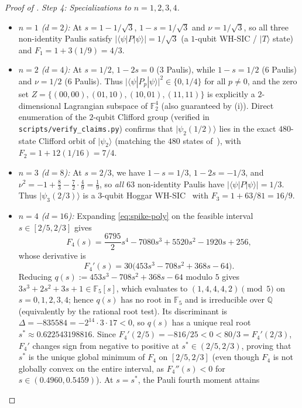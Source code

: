 \documentclass[11pt,a4paper]{article}
\theoremstyle{plain}
\theoremstyle{definition}
\theoremstyle{remark}
\newcommand{\Q}{\mathbb{Q}}
\newcommand{\F}{\mathbb{F}}
\newcommand{\ket}[1]{|#1\rangle}
\newcommand{\expval}[2]{\langle#1|#2|#1\rangle}
\newcommand{\abs}[1]{\lvert#1\rvert}
\numberwithin{equation}{section}
\begin{document}
\begin{proof}[Proof of ]
\emph{Step 4: Specializations to $n = 1, 2, 3, 4$.}
\begin{itemize}[leftmargin=1.8em]
  \item \emph{$n = 1$ ($d = 2$):} At $s = 1 - 1/\sqrt{3}$, $1 - s = 1/\sqrt{3}$ and $\nu = 1/\sqrt{3}$, so all three non-identity Paulis satisfy $\abs{\expval{\psi}{P}} = 1/\sqrt{3}$ (a $1$-qubit WH-SIC / $\ket{T}$ state) and $F_1 = 1 + 3(1/9) = 4/3$.
  \item \emph{$n = 2$ ($d = 4$):} At $s = 1/2$, $1 - 2s = 0$ ($3$ Paulis), while $1 - s = 1/2$ ($6$ Paulis) and $\nu = 1/2$ ($6$ Paulis). Thus $\abs{\expval{\psi}{P_p}}^2 \in \{0, 1/4\}$ for all $p \neq 0$, and the zero set $Z = \{(00,00),(01,10),(10,01),(11,11)\}$ is explicitly a $2$-dimensional Lagrangian subspace of $\F_2^4$ (also guaranteed by (i)). Direct enumeration of the $2$-qubit Clifford group (verified in \texttt{\small scripts/\allowbreak verify\_claims.py}) confirms that $\ket{\psi_2(1/2)}$ lies in the exact $480$-state Clifford orbit of $\ket{\psi_2}$ (matching the $480$ states of~\cite{liu2026maximal}), with $F_2 = 1 + 12(1/16) = 7/4$.
  \item \emph{$n = 3$ ($d = 8$):} At $s = 2/3$, we have $1 - s = 1/3$, $1 - 2s = -1/3$, and $\nu^2 = -1 + \frac{8}{3} - \frac{7}{2}\cdot\frac{4}{9} = \frac{1}{9}$, so \emph{all $63$} non-identity Paulis have $\abs{\expval{\psi}{P}} = 1/3$. Thus $\ket{\psi_3(2/3)}$ is a $3$-qubit Hoggar WH-SIC~\cite{hoggar1998lines} with $F_3 = 1 + 63/81 = 16/9$.
  \item \emph{$n = 4$ ($d = 16$):} Expanding \eqref{eq:spike-poly} on the feasible interval $s \in [2/5, 2/3]$ gives
  \[
    F_4(s) = \frac{6795}{2}s^4 - 7080 s^3 + 5520 s^2 - 1920 s + 256,
  \]
  whose derivative is
  \[
    F_4'(s) = 30\bigl(453 s^3 - 708 s^2 + 368 s - 64\bigr).
  \]
  Reducing $q(s) := 453 s^3 - 708 s^2 + 368 s - 64$ modulo $5$ gives $3s^3 + 2s^2 + 3s + 1 \in \F_5[s]$, which evaluates to $(1, 4, 4, 4, 2) \pmod{5}$ on $s = 0, 1, 2, 3, 4$; hence $q(s)$ has no root in $\F_5$ and is irreducible over $\Q$ (equivalently by the rational root test). Its discriminant is $\Delta = -835584 = -2^{14}\cdot 3 \cdot 17 < 0$, so $q(s)$ has a unique real root $s^* \approx 0.622543198816$. Since $F_4'(2/5) = -816/25 < 0 < 80/3 = F_4'(2/3)$, $F_4'$ changes sign from negative to positive at $s^* \in (2/5, 2/3)$, proving that $s^*$ is the unique global minimum of $F_4$ on $[2/5, 2/3]$ (even though $F_4$ is not globally convex on the entire interval, as $F_4''(s) < 0$ for $s \in (0.4960, 0.5459)$). At $s = s^*$, the Pauli fourth moment attains

\end{itemize}
\end{proof}
\end{document}
